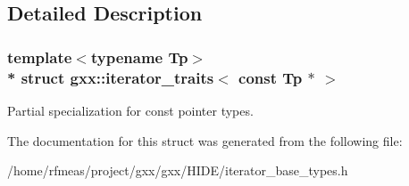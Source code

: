 \subsection{Detailed Description}
\subsubsection*{template$<$typename Tp$>$\\*
struct gxx\+::iterator\+\_\+traits$<$ const Tp $\ast$ $>$}

Partial specialization for const pointer types. 

The documentation for this struct was generated from the following file\+:\begin{DoxyCompactItemize}
\item 
/home/rfmeas/project/gxx/gxx/\+H\+I\+D\+E/iterator\+\_\+base\+\_\+types.\+h\end{DoxyCompactItemize}
